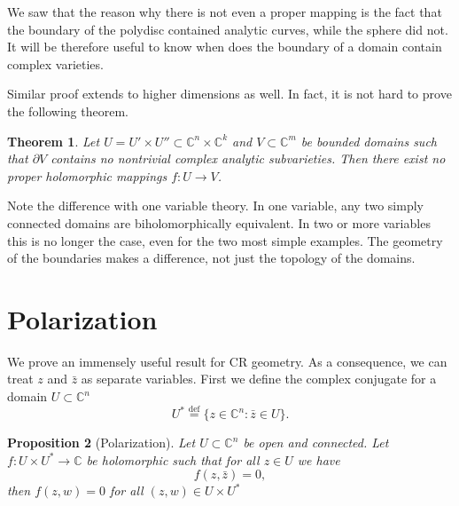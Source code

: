 \documentclass[12pt,openany]{book}
\newcommand{\C}{{\mathbb{C}}}
\newcommand{\sectionnewpage}{}
\theoremstyle{plain}
\newtheorem{thm}{Theorem}[section]
\newtheorem{prop}[thm]{Proposition}
\theoremstyle{remark}
\theoremstyle{definition}
\theoremstyle{exercise}
\theoremstyle{example}
\begin{document}
We saw that the reason why there is not even a proper mapping is the fact
that the boundary of the polydisc contained analytic curves, while
the sphere did not.  It will be therefore useful to know when does
the boundary of a domain contain complex varieties.

Similar proof extends to higher dimensions as well.  In fact, it is not hard
to prove the following theorem.

\begin{thm}
Let $U = U' \times U'' \subset \C^n \times \C^k$ and $V \subset \C^m$ be bounded
domains such that $\partial V$ contains no nontrivial
complex analytic subvarieties.  Then there exist no proper
holomorphic mappings $f \colon U \to V$.
\end{thm}

Note the difference with one variable theory.  In one variable, any two
simply connected domains are biholomorphically equivalent.  In two or more
variables
this is no longer the case, even for the two most simple examples.  The
geometry of the boundaries makes a difference, not just the topology
of the domains.


\sectionnewpage
\section{Polarization} \label{sec:polarization}

We prove an immensely useful result for CR geometry.  As a consequence,
we can treat $z$ and $\bar{z}$ as separate
variables.  First we define
the complex conjugate
for a domain $U \subset \C^n$
\begin{equation}
U^* \overset{\text{def}}{=} \{ z \in \C^n : \bar{z} \in U \} .
\end{equation}

\begin{prop}[Polarization]
Let $U \subset \C^n$ be open and connected.
Let $f \colon U \times U^* \to \C$ be holomorphic such that
for all $z \in U$ we have
\begin{equation}
f(z,\bar{z}) = 0 ,
\end{equation}
then $f(z,w) = 0$ for all $(z,w) \in U \times U^*$
\end{prop}
\end{document}
